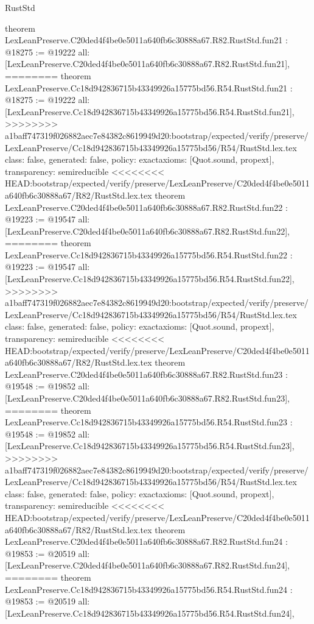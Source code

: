 \begin{lexlean}{RustStd}
\begin{coremodule}
{\begin{coremodule}
{{{{{{{{{{{{{{{{{{{{{{{theorem LexLeanPreserve.C20ded4f4be0e5011a640fb6c30888a67.R82.RustStd.fun21 : @18275 := @19222 {
  all: [LexLeanPreserve.C20ded4f4be0e5011a640fb6c30888a67.R82.RustStd.fun21],
========
theorem LexLeanPreserve.Cc18d942836715b43349926a15775bd56.R54.RustStd.fun21 : @18275 := @19222 {
  all: [LexLeanPreserve.Cc18d942836715b43349926a15775bd56.R54.RustStd.fun21],
>>>>>>>> a1baff747319f026882aec7e84382c8619949d20:bootstrap/expected/verify/preserve/LexLeanPreserve/Cc18d942836715b43349926a15775bd56/R54/RustStd.lex.tex
  class: false,
  generated: false,
  policy: exact{axioms: [Quot.sound, propext]},
  transparency: semireducible
}
<<<<<<<< HEAD:bootstrap/expected/verify/preserve/LexLeanPreserve/C20ded4f4be0e5011a640fb6c30888a67/R82/RustStd.lex.tex
theorem LexLeanPreserve.C20ded4f4be0e5011a640fb6c30888a67.R82.RustStd.fun22 : @19223 := @19547 {
  all: [LexLeanPreserve.C20ded4f4be0e5011a640fb6c30888a67.R82.RustStd.fun22],
========
theorem LexLeanPreserve.Cc18d942836715b43349926a15775bd56.R54.RustStd.fun22 : @19223 := @19547 {
  all: [LexLeanPreserve.Cc18d942836715b43349926a15775bd56.R54.RustStd.fun22],
>>>>>>>> a1baff747319f026882aec7e84382c8619949d20:bootstrap/expected/verify/preserve/LexLeanPreserve/Cc18d942836715b43349926a15775bd56/R54/RustStd.lex.tex
  class: false,
  generated: false,
  policy: exact{axioms: [Quot.sound, propext]},
  transparency: semireducible
}
<<<<<<<< HEAD:bootstrap/expected/verify/preserve/LexLeanPreserve/C20ded4f4be0e5011a640fb6c30888a67/R82/RustStd.lex.tex
theorem LexLeanPreserve.C20ded4f4be0e5011a640fb6c30888a67.R82.RustStd.fun23 : @19548 := @19852 {
  all: [LexLeanPreserve.C20ded4f4be0e5011a640fb6c30888a67.R82.RustStd.fun23],
========
theorem LexLeanPreserve.Cc18d942836715b43349926a15775bd56.R54.RustStd.fun23 : @19548 := @19852 {
  all: [LexLeanPreserve.Cc18d942836715b43349926a15775bd56.R54.RustStd.fun23],
>>>>>>>> a1baff747319f026882aec7e84382c8619949d20:bootstrap/expected/verify/preserve/LexLeanPreserve/Cc18d942836715b43349926a15775bd56/R54/RustStd.lex.tex
  class: false,
  generated: false,
  policy: exact{axioms: [Quot.sound, propext]},
  transparency: semireducible
}
<<<<<<<< HEAD:bootstrap/expected/verify/preserve/LexLeanPreserve/C20ded4f4be0e5011a640fb6c30888a67/R82/RustStd.lex.tex
theorem LexLeanPreserve.C20ded4f4be0e5011a640fb6c30888a67.R82.RustStd.fun24 : @19853 := @20519 {
  all: [LexLeanPreserve.C20ded4f4be0e5011a640fb6c30888a67.R82.RustStd.fun24],
========
theorem LexLeanPreserve.Cc18d942836715b43349926a15775bd56.R54.RustStd.fun24 : @19853 := @20519 {
  all: [LexLeanPreserve.Cc18d942836715b43349926a15775bd56.R54.RustStd.fun24],
}}}}}}}}}}}}}}}}}}}}}}}}}}}}
\end{coremodule}}
\end{coremodule}
\end{lexlean}
